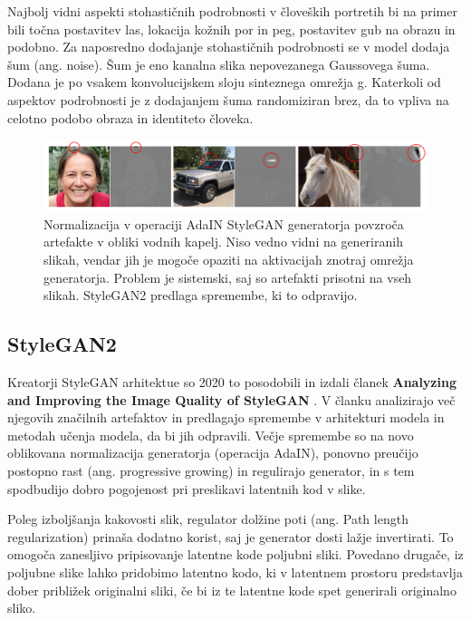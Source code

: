 \documentclass[a4paper,12pt,openright]{book}
\begin{document}
Najbolj vidni aspekti stohastičnih podrobnosti v človeških portretih bi na primer bili točna postavitev las, lokacija kožnih por in peg, postavitev gub na obrazu in podobno. Za naposredno dodajanje stohastičnih podrobnosti se v model dodaja šum (ang. noise). Šum je eno kanalna slika nepovezanega Gaussovega šuma. Dodana je po vsakem konvolucijskem sloju sinteznega omrežja g. Katerkoli od aspektov podrobnosti je z dodajanjem šuma randomiziran brez, da to vpliva na celotno podobo obraza in identiteto človeka.

\begin{figure}[htb]
\begin{center}
  \includegraphics[width=1\textwidth]{images/stylegan_artefacts.png}
\end{center}
  \caption{Normalizacija v operaciji AdaIN StyleGAN generatorja povzroča artefakte v obliki vodnih kapelj. Niso vedno vidni na generiranih slikah, vendar jih je mogoče opaziti na aktivacijah znotraj omrežja generatorja. Problem je sistemski, saj so artefakti prisotni na vseh slikah. StyleGAN2 predlaga spremembe, ki to odpravijo. }
  \label{Artefakti}
\end{figure}



\subsection{StyleGAN2}

Kreatorji StyleGAN arhitektue so 2020 to posodobili in izdali članek \textbf{Analyzing and Improving the Image Quality of StyleGAN} \cite{Karras2019stylegan2}. V članku analizirajo več njegovih značilnih artefaktov in predlagajo spremembe v arhitekturi modela in metodah učenja modela, da bi jih odpravili. Večje spremembe so na novo oblikovana normalizacija generatorja (operacija AdaIN), ponovno preučijo postopno rast (ang. progressive growing) in regulirajo generator, in s tem spodbudijo dobro pogojenost pri preslikavi latentnih kod v slike. 

Poleg izboljšanja kakovosti slik, regulator dolžine poti (ang. Path length regularization) prinaša dodatno korist, saj je generator dosti lažje invertirati. To omogoča zanesljivo pripisovanje latentne kode poljubni sliki. Povedano drugače, iz poljubne slike lahko pridobimo latentno kodo, ki v latentnem prostoru predstavlja dober približek originalni sliki, če bi iz te latentne kode spet generirali originalno sliko. 
\end{document}
